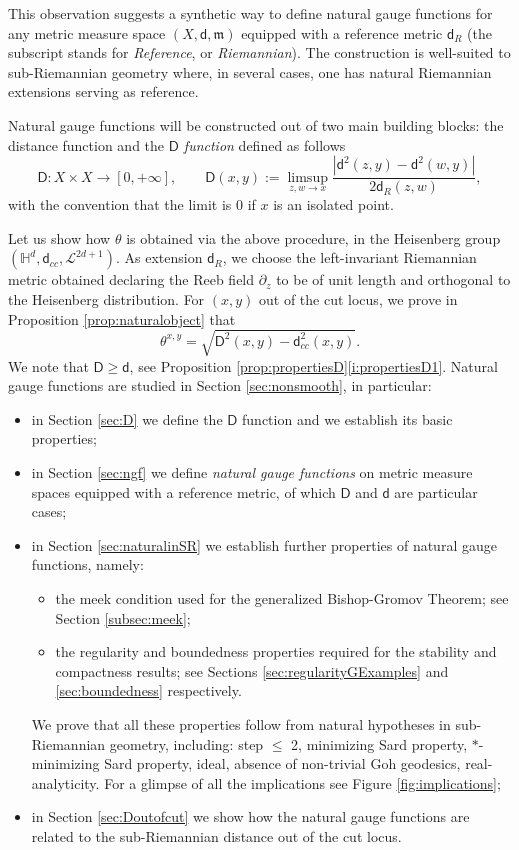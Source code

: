 \documentclass[11pt,a4paper]{article}
\theoremstyle{plain}
\theoremstyle{definition}
\theoremstyle{remark}
\numberwithin{equation}{section}
\renewcommand{\H}{\mathbb{H}}
\newcommand{\mm}{\mathfrak m}
\newcommand{\sfd}{\mathsf d}
\newcommand{\sfD}{\mathsf D}
\begin{document}
This observation suggests a synthetic way to define natural gauge functions for any metric measure space $(X,\sfd,\mm)$ equipped with a reference metric $\sfd_R$ (the subscript stands for \emph{Reference}, or \emph{Riemannian}). The construction is well-suited to sub-Riemannian geometry where, in several cases, one has natural Riemannian extensions serving as reference.  

Natural gauge functions will be constructed out of two main building blocks: the distance function and the \emph{$\sfD$ function} defined as follows 
\begin{equation}\label{eq:defD-Intro}
\sfD :X\times X \to [0,+\infty], \qquad \sfD(x,y) :=  \limsup_{z,w\to x} \frac{|\sfd^2(z,y)-\sfd^2(w,y)|} {2 \sfd_R(z,w)}  ,
\end{equation}
with the convention that the limit is $0$ if $x$ is an isolated point.

Let us show how $\theta$ is obtained via the above procedure, in the Heisenberg group $(\H^d,\sfd_{cc},\mathscr{L}^{2d+1})$. As extension $\sfd_R$, we choose the left-invariant Riemannian metric obtained declaring the Reeb field $\partial_z$ to be of unit length and orthogonal to the Heisenberg distribution.  For $(x,y)$ out of the cut locus, we prove in Proposition \ref{prop:naturalobject} that
\begin{equation}
\theta^{x,y}=\sqrt{\sfD^2(x,y)-\sfd_{cc}^2(x,y)}.
\end{equation}
We note that $\sfD \geq \sfd$, see Proposition \ref{prop:propertiesD}\ref{i:propertiesD1}. Natural gauge functions are studied in  Section \ref{sec:nonsmooth}, in particular:
\begin{itemize}
\item in Section \ref{sec:D} we define the $\sfD$ function and we establish its basic properties;
\item in Section \ref{sec:ngf} we define \emph{natural gauge functions} on metric measure spaces equipped with a reference metric, of which $\sfD$ and $\sfd$ are particular cases;
\item in Section \ref{sec:naturalinSR} we establish further properties of natural gauge functions, namely:
\begin{itemize}
\item the meek condition used for the generalized Bishop-Gromov Theorem; see Section \ref{subsec:meek};
\item the regularity and  boundedness properties required for the stability and compactness results; see Sections \ref{sec:regularityGExamples} and  \ref{sec:boundedness} respectively.
\end{itemize}
We prove that all these properties follow from natural hypotheses in sub\--\-Rie\-man\-nian geometry, including: step $\leq$ 2, minimizing Sard property, $*$-minimizing Sard property, ideal, absence of non-trivial Goh geodesics, real-analyticity. For a glimpse of all the implications see Figure \ref{fig:implications};
\item in Section \ref{sec:Doutofcut} we show how the natural gauge functions are related to the sub-Riemannian distance out of the cut locus.
\end{itemize} 
\end{document}
